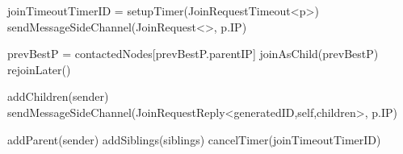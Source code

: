 \begin{algorithm}
\begin{algorithmic}[1]
    \asdprocedure[joinAsChild(p)]
        \State joinTimeoutTimerID = setupTimer(JoinRequestTimeout<p>)
        \State sendMessageSideChannel(JoinRequest<>, p.IP)
    \asdend

    \asdupon[JoinRequestTimeout(p)]
            \State prevBestP = contactedNodes[prevBestP.parentIP]
            \State joinAsChild(prevBestP)
        \Else
            \State rejoinLater()
        \EndIf
    \asdend

        \asdassign addChildren(sender) 
        \State sendMessageSideChannel(JoinRequestReply<generatedID,self,children>, p.IP)
    \asdend
        
        \State addParent(sender) 
        \State addSiblings(siblings) 
        \State cancelTimer(joinTimeoutTimerID)
    \asdend
\end{algorithmic}
\end{algorithm}
